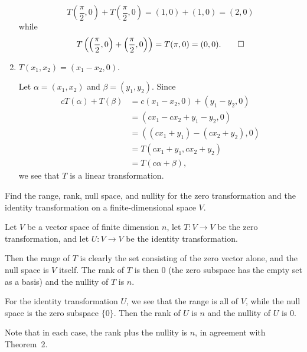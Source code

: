 \begin{enumerate}
\begin{solution}
\begin{equation*}
      T\left(\frac\pi2, 0\right) + T\left(\frac\pi2, 0\right)
      = (1, 0) + (1, 0) = (2, 0)
    \end{equation*}
    while
    \begin{equation*}
      T\left(\left(\frac\pi2, 0\right) + \left(\frac\pi2, 0\right)\right)
      = T(\pi, 0) = (0, 0). \qedhere
    \end{equation*}
  \end{solution}
\item $T(x_1, x_2) = (x_1 - x_2, 0)$.
  \begin{solution}
    Let $\alpha = (x_1, x_2)$ and $\beta = (y_1, y_2)$. Since
    \begin{align*}
      cT(\alpha) + T(\beta)
      &= c(x_1 - x_2, 0) + (y_1 - y_2, 0) \\
      &= (cx_1 - cx_2 + y_1 - y_2, 0) \\
      &= ((cx_1 + y_1) - (cx_2 + y_2), 0) \\
      &= T(cx_1 + y_1, cx_2 + y_2) \\
      &= T(c\alpha + \beta),
    \end{align*}
    we see that $T$ is a linear transformation.
  \end{solution}
\end{enumerate}

 Find the range, rank, null space, and nullity for the zero
transformation and the identity transformation on a finite-dimensional
space $V$.
\begin{solution}
  Let $V$ be a vector space of finite dimension $n$, let
  $T\colon V\to V$ be the zero transformation, and let
  $U\colon V\to V$ be the identity transformation.

  Then the range of $T$ is clearly the set consisting of the zero
  vector alone, and the null space is $V$ itself. The rank of $T$ is
  then $0$ (the zero subspace has the empty set as a basis) and the
  nullity of $T$ is $n$.

  For the identity transformation $U$, we see that the range is all of
  $V$, while the null space is the zero subspace $\{0\}$. Then the
  rank of $U$ is $n$ and the nullity of $U$ is $0$.

  Note that in each case, the rank plus the nullity is $n$, in
  agreement with Theorem~2.
\end{solution}
